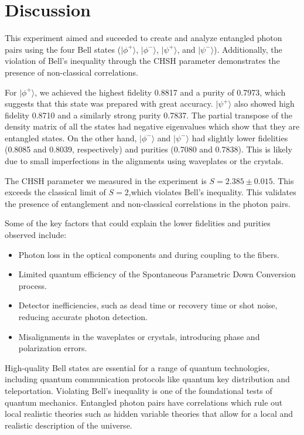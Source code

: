 \section{Discussion}
This experiment aimed and suceeded to create and analyze entangled photon pairs using the four Bell states (\( |\phi^+\rangle \), \( |\phi^-\rangle \), \( |\psi^+\rangle \), and \( |\psi^-\rangle \)). Additionally, the violation of Bell's inequality through the CHSH parameter demonstrates the presence of non-classical correlations.

For \( |\phi^+\rangle \), we achieved the highest fidelity 0.8817 and a purity of 0.7973, which suggests that this state was prepared with great accuracy.
\( |\psi^+\rangle \) also showed high fidelity 0.8710 and a similarly strong purity 0.7837. The partial transpose of the density matrix of all the states had negative eigenvalues which show that they are entangled states.
On the other hand, \( |\phi^-\rangle \) and \( |\psi^-\rangle \) had slightly lower fidelities (0.8085 and 0.8039, respectively) and purities (0.7080 and 0.7838). This is likely due to small imperfections in the alignments using waveplates or the crystals. 

The CHSH parameter we measured in the experiment is \( S = 2.385 \pm 0.015 \). This exceeds the classical limit of \( S = 2 \),which violates Bell’s inequality. This validates the presence of entanglement and non-classical correlations in the photon pairs.

Some of the key factors that could explain the lower fidelities and purities observed include:

\begin{itemize}
    \item Photon loss in the optical components and during coupling to the fibers.
    \item Limited quantum efficiency of the Spontaneous Parametric Down Conversion process.
    \item Detector inefficiencies, such as dead time or recovery time or shot noise, reducing accurate photon detection.
    \item Misalignments in the waveplates or crystals, introducing phase and polarization errors.
\end{itemize}

High-quality Bell states  are essential for a range of quantum technologies, including quantum communication protocols like quantum key distribution and teleportation. Violating Bell's inequality is one of the foundational tests of quantum mechanics. Entangled photon pairs have correlations which rule out local realistic theories such as hidden variable theories that allow for a local and realistic description of the universe.
